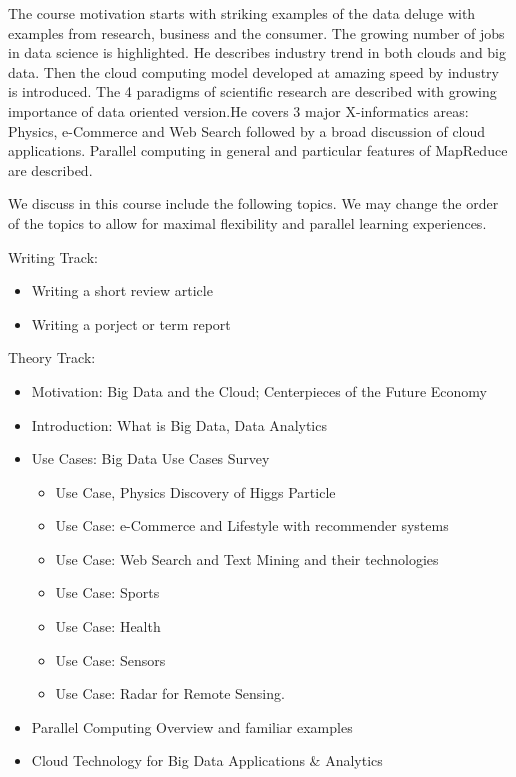 The course motivation starts with striking examples of the data deluge
with examples from research, business and the consumer. The growing
number of jobs in data science is highlighted. He describes industry
trend in both clouds and big data. Then the cloud computing model
developed at amazing speed by industry is introduced. The 4 paradigms of
scientific research are described with growing importance of data
oriented version.He covers 3 major X-informatics areas: Physics,
e-Commerce and Web Search followed by a broad discussion of cloud
applications. Parallel computing in general and particular features of
MapReduce are described.

We discuss in this course include the following topics. We may change
the order of the topics to allow for maximal flexibility and parallel
learning experiences.

Writing Track:

\begin{itemize}
\item  Writing a short review article
\item  Writing a porject or term report
\end{itemize}

Theory Track:

\begin{itemize}
\item  Motivation: Big Data and the Cloud; Centerpieces of the Future Economy
\item  Introduction: What is Big Data, Data Analytics
\item  Use Cases: Big Data Use Cases Survey

  \begin{itemize}
  \item    Use Case, Physics Discovery of Higgs Particle
  \item    Use Case: e-Commerce and Lifestyle with recommender systems
  \item    Use Case: Web Search and Text Mining and their technologies
  \item    Use Case: Sports
  \item    Use Case: Health
  \item    Use Case: Sensors
  \item    Use Case: Radar for Remote Sensing.
  \end{itemize}

\item Parallel Computing Overview and familiar examples
\item Cloud Technology for Big Data Applications \& Analytics
\end{itemize}

